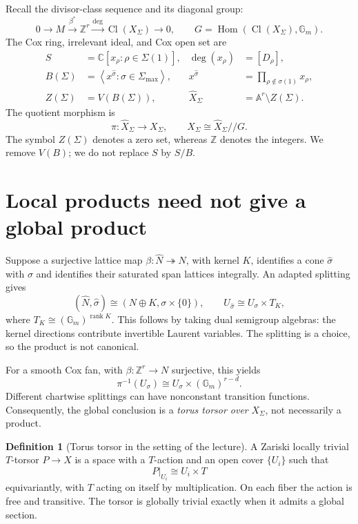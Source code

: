 \documentclass[11pt]{article}
\theoremstyle{definition}
\newtheorem{Def}{Definition}
\theoremstyle{remark}
\DeclareMathOperator{\Cl}{Cl}
\DeclareMathOperator{\Hom}{Hom}
\newcommand{\A}{\mathbb A}
\newcommand{\C}{\mathbb C}
\newcommand{\Z}{\mathbb Z}
\newcommand{\Gm}{\mathbb G_m}
\begin{document}
Recall the divisor-class sequence and its diagonal group:
\[
0\longrightarrow M\xrightarrow{\beta^*}\Z^r
 \xrightarrow{\deg}\Cl(X_\Sigma)\longrightarrow0,
\qquad
G=\Hom(\Cl(X_\Sigma),\Gm).
\]
The Cox ring, irrelevant ideal, and Cox open set are
\[
\begin{aligned}
S&=\C[x_\rho:\rho\in\Sigma(1)],
       &\deg(x_\rho)&=[D_\rho],\\
B(\Sigma)&=\left\langle x^{\widehat\sigma}:
                  \sigma\in\Sigma_{\max}\right\rangle,
       &x^{\widehat\sigma}&=\prod_{\rho\notin\sigma(1)}x_\rho,\\
Z(\Sigma)&=V(B(\Sigma)),
       &\widehat X_\Sigma&=\A^r\setminus Z(\Sigma).
\end{aligned}
\]
The quotient morphism is
\[
\pi:\widehat X_\Sigma\longrightarrow X_\Sigma,
\qquad
X_\Sigma\cong\widehat X_\Sigma\mathbin{//}G.
\]
The symbol \(Z(\Sigma)\) denotes a zero set, whereas \(\Z\) denotes
the integers. We remove \(V(B)\); we do not replace \(S\) by \(S/B\).

\section{Local products need not give a global product}

Suppose a surjective lattice map
\(\beta:\widehat N\twoheadrightarrow N\), with kernel \(K\),
identifies a cone \(\widehat\sigma\) with \(\sigma\) and identifies
their saturated span lattices integrally. An adapted splitting gives
\[
(\widehat N,\widehat\sigma)
 \cong(N\oplus K,\sigma\times\{0\}),\qquad
U_{\widehat\sigma}\cong U_\sigma\times T_K,
\]
where \(T_K\cong(\Gm)^{\operatorname{rank}K}\).
This follows by taking dual semigroup algebras: the kernel directions
contribute invertible Laurent variables. The splitting is a choice,
so the product is not canonical.

For a smooth Cox fan, with \(\beta:\Z^r\to N\) surjective, this yields
\[
\pi^{-1}(U_\sigma)\cong U_\sigma\times(\Gm)^{r-d}.
\]
Different chartwise splittings can have nonconstant transition
functions. Consequently, the global conclusion is a
\emph{torus torsor over} \(X_\Sigma\), not necessarily a product.

\begin{Def}[Torus torsor in the setting of the lecture]
A Zariski locally trivial \(T\)-torsor \(P\to X\) is a space with a
\(T\)-action and an open cover \(\{U_i\}\) such that
\[
P|_{U_i}\cong U_i\times T
\]
equivariantly, with \(T\) acting on itself by multiplication. On each
fiber the action is free and transitive. The torsor is globally
trivial exactly when it admits a global section.
\end{Def}
\end{document}
